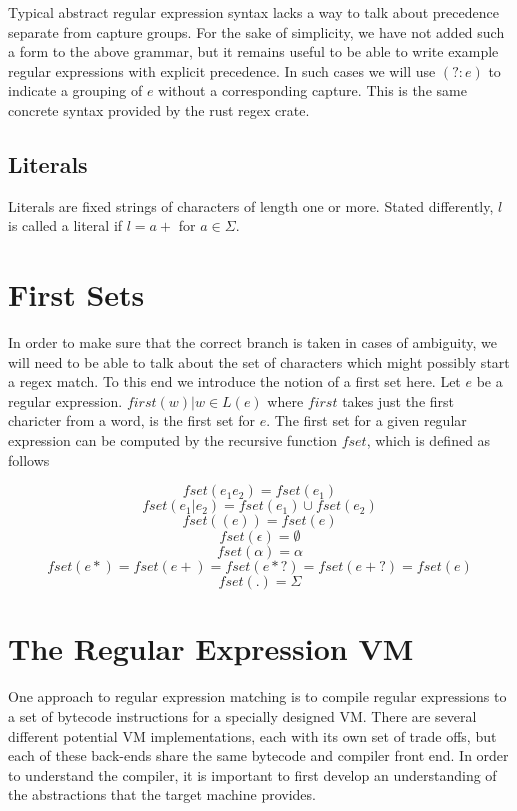 Typical abstract regular expression syntax lacks a way to talk about
precedence separate from capture groups. For the sake of simplicity,
we have not added such a form to the above grammar, but it remains
useful to be able to write example regular expressions with explicit
precedence. In such cases we will use $(?:e)$ to indicate a grouping
of $e$ without a corresponding capture. This is the same concrete syntax
provided by the rust regex crate.

\subsection{Literals}

Literals are fixed strings of characters of length one or more.
Stated differently, $l$ is called a literal if $l = a+$ for $a \in \Sigma$.

\section{First Sets}

In order to make sure that the correct branch is taken in cases of
ambiguity, we will need to be able to talk about the set of characters
which might possibly start a regex match. To this end we introduce the
notion of a first set here. Let $e$ be a regular expression.
${first(w) \rvert w \in L(e)}$ where $first$ takes just the first charicter
from a word, is the first set for $e$. The first set for a given
regular expression can be computed by the recursive function $fset$,
which is defined as follows

\[
  fset(e_1 e_2) = fset(e_1)
\]
\[
  fset(e_1 \rvert e_2) = fset(e_1) \cup fset(e_2)
\]
\[
  fset((e)) = fset(e)
\]
\[
  fset(\epsilon) = \emptyset
\]
\[
  fset(\alpha) = \alpha
\]
\[
  fset(e*) = fset(e+) = fset(e*?) = fset(e+?) = fset(e)
\]
\[
  fset(.) = \Sigma
\]


\section{The Regular Expression VM}

One approach to regular expression matching is to compile regular expressions
to a set of bytecode instructions for a specially designed VM. There
are several different potential VM implementations, each with its own
set of trade offs, but each of these back-ends share the same bytecode
and compiler front end. In order to understand the compiler, it
is important to first develop an understanding of the abstractions
that the target machine provides.

